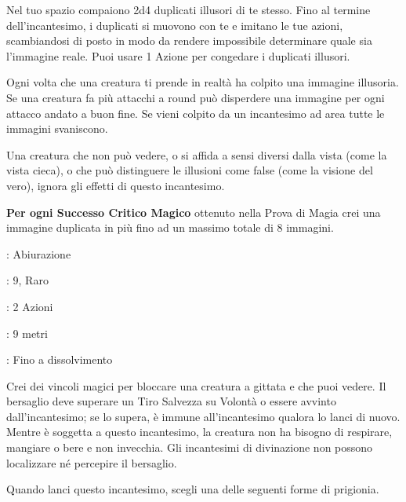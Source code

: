 \begin{multicols}{2}
Nel tuo spazio compaiono 2d4 duplicati illusori di te stesso. Fino al termine dell'incantesimo, i duplicati si muovono con te e imitano le tue azioni, scambiandosi di posto in modo da rendere impossibile determinare quale sia l'immagine reale. Puoi usare 1 Azione per congedare i duplicati illusori.

Ogni volta che una creatura ti prende in realtà ha colpito una immagine illusoria.
Se una creatura fa più attacchi a round può disperdere una immagine per ogni attacco andato a buon fine. Se vieni colpito da un incantesimo ad area tutte le immagini svaniscono.

Una creatura che non può vedere, o si affida a sensi diversi dalla vista (come la vista cieca), o che può distinguere le illusioni come false (come la visione del vero), ignora gli effetti di questo incantesimo.

\textbf{Per ogni Successo Critico Magico} ottenuto nella Prova di Magia crei una immagine duplicata in più fino ad un massimo totale di 8 immagini.

\noindent\colorbox{OBSSgold!10}{
\begin{minipage}{0.95\linewidth}
\begin{description}[noitemsep, topsep=0pt, parsep=0pt, partopsep=0pt, leftmargin=0cm, labelwidth=1.3cm]
	\item[\textbf{Lista}]: Abiurazione
	\item[\textbf{Livello}]: 9, Raro
	\item[\textbf{Lancio}]: 2 Azioni
	\item[\textbf{Gittata}]: 9 metri
	\item[\textbf{Durata}]: Fino a dissolvimento
\end{description}
\end{minipage}}\smallskip

Crei dei vincoli magici per bloccare una creatura a gittata e che puoi vedere. Il bersaglio deve superare un Tiro Salvezza su Volontà o essere avvinto dall'incantesimo; se lo supera, è immune all'incantesimo qualora lo lanci di nuovo. Mentre è soggetta a questo incantesimo, la creatura non ha bisogno di respirare, mangiare o bere e non invecchia. Gli incantesimi di divinazione non possono localizzare né percepire il bersaglio.

Quando lanci questo incantesimo, scegli una delle seguenti forme di prigionia.


\end{multicols}
